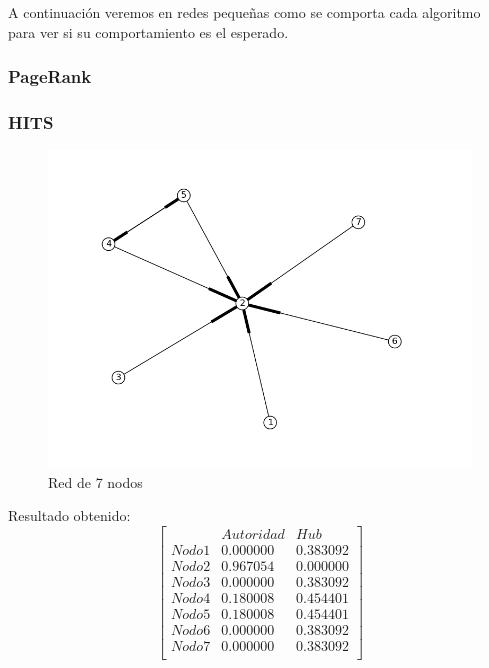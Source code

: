 A continuación veremos en redes pequeñas como se comporta cada algoritmo para ver si su comportamiento es el esperado.

\subsubsection{PageRank}

\subsubsection{HITS}
 \begin{figure}[!htb]
\begin{center}
    \includegraphics[scale=0.5]{imagenes/test4.png}
    \caption{Red de 7 nodos}
    \end{center}
\end{figure}

Resultado obtenido:
   $$ 
\begin{bmatrix}
              &    Autoridad  &  Hub \\
 Nodo 1 &   0.000000    &      0.383092       \\
 Nodo 2   &  0.967054    &  0.000000     \\
 Nodo 3   &  0.000000   &     0.383092  \\
 Nodo 4   &  0.180008    &     0.454401       \\
 Nodo 5   &  0.180008    &     0.454401        \\
 Nodo 6   &  0.000000    &      0.383092     \\
 Nodo 7   &  0.000000   &     0.383092 \\
\end{bmatrix} 
$$

